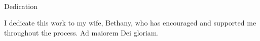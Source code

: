 

\renewcommand{\baselinestretch}{2}
\small\normalsize
\hbox{\ }

\vspace{-.65in}

\begin{center}
\large{Dedication}
\end{center}

\noindent I dedicate this work to my wife, Bethany, who has encouraged and supported me throughout the process. Ad maiorem Dei gloriam.
